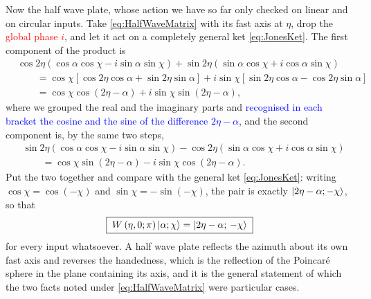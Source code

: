             Now the half wave plate, whose action we have so far only checked on linear and on circular inputs. Take \ref{eq:HalfWaveMatrix} with its fast axis at $\eta$, drop the \textcolor{red}{global phase $i$}, and let it act on a completely general ket \ref{eq:JonesKet}. The first component of the product is
            \begin{align*}
                &\cos2\eta\left(\cos\alpha\cos\chi-i\sin\alpha\sin\chi\right)+\sin2\eta\left(\sin\alpha\cos\chi+i\cos\alpha\sin\chi\right) \\
                &\qquad = \cos\chi\left[\cos2\eta\cos\alpha+\sin2\eta\sin\alpha\right]+i\sin\chi\left[\sin2\eta\cos\alpha-\cos2\eta\sin\alpha\right] \\
                &\qquad = \cos\chi\cos\left(2\eta-\alpha\right)+i\sin\chi\sin\left(2\eta-\alpha\right),
            \end{align*}
            where we grouped the real and the imaginary parts and \textcolor{blue}{recognised in each bracket the cosine and the sine of the difference $2\eta-\alpha$}, and the second component is, by the same two steps,
            \begin{align*}
                &\sin2\eta\left(\cos\alpha\cos\chi-i\sin\alpha\sin\chi\right)-\cos2\eta\left(\sin\alpha\cos\chi+i\cos\alpha\sin\chi\right) \\
                &\qquad = \cos\chi\sin\left(2\eta-\alpha\right)-i\sin\chi\cos\left(2\eta-\alpha\right).
            \end{align*}
            Put the two together and compare with the general ket \ref{eq:JonesKet}: writing $\cos\chi=\cos(-\chi)$ and $\sin\chi=-\sin(-\chi)$, the pair is exactly $\ket{2\eta-\alpha;-\chi}$, so that
            \begin{equation}\label{eq:HWPaction}
                \boxed{\;W\left(\eta,0;\pi\right)\ket{\alpha;\chi} = \ket{2\eta-\alpha;\,-\chi}\;}
            \end{equation}
            for every input whatsoever. A half wave plate reflects the azimuth about its own fast axis and reverses the handedness, which is the reflection of the Poincaré sphere in the plane containing its axis, and it is the general statement of which the two facts noted under \ref{eq:HalfWaveMatrix} were particular cases.

